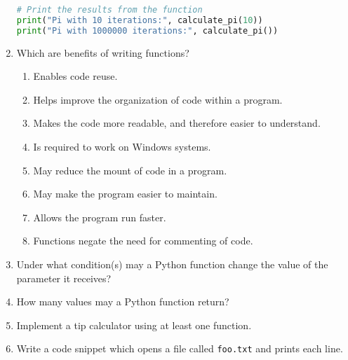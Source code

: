 \documentclass[letter,10pt]{article}
\begin{document}
\begin{enumerate}
\begin{lstlisting}[language=python]
# Print the results from the function
print("Pi with 10 iterations:", calculate_pi(10))
print("Pi with 1000000 iterations:", calculate_pi())
    \end{lstlisting}

    \item Which are benefits of writing functions?
    \begin{enumerate}
        \item Enables code reuse.
        \item Helps improve the organization of code within a program.
        \item Makes the code more readable, and therefore easier to understand.
        \item Is required to work on Windows systems.
        \item May reduce the mount of code in a program.
        \item May make the program easier to maintain.
        \item Allows the program run faster.
        \item Functions negate the need for commenting of code.
    \end{enumerate}

    \item Under what condition(s) may a Python function change the value of the parameter it receives?

    \item How many values may a Python function return?

    \item Implement a tip calculator using at least one function.

    \item Write a code snippet which opens a file called \texttt{foo.txt} and prints each line.

\end{enumerate}
\end{document}
